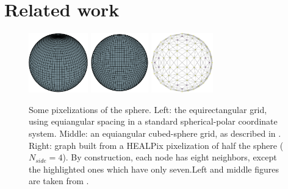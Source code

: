 \documentclass[final,twocolumn,3p,times,sort&compress]{elsarticle}
\newcommand{\1}{\b{1}}              %
\newcommand{\0}{\b{0}}              %
\begin{document}
\section{Related work}
\label{sec:related_work}

\begin{figure}
    \centering
    \includegraphics[height=7em]{sphere_grid_equirectangular}
    \hfill
    \includegraphics[height=7em]{sphere_grid_cubedsphere}
    \hfill
    \includegraphics[height=7em]{half_graph_4}
    \caption[]{Some pixelizations of the sphere. Left: the equirectangular grid, using equiangular spacing in a standard spherical-polar coordinate system. Middle: an equiangular cubed-sphere grid, as described in \citep{ronchi1996cubed}. Right: graph built from a HEALPix pixelization of half the sphere ($N_{side} = 4$). By construction, each node has eight neighbors, except the highlighted ones which have only seven.\footnotemark[4] Left and middle figures are taken from \citep{boomsma2017spherical}.}
    \label{fig:sphere_grids}
    \label{fig:healpix_graph_4}
\end{figure}
\end{document}

